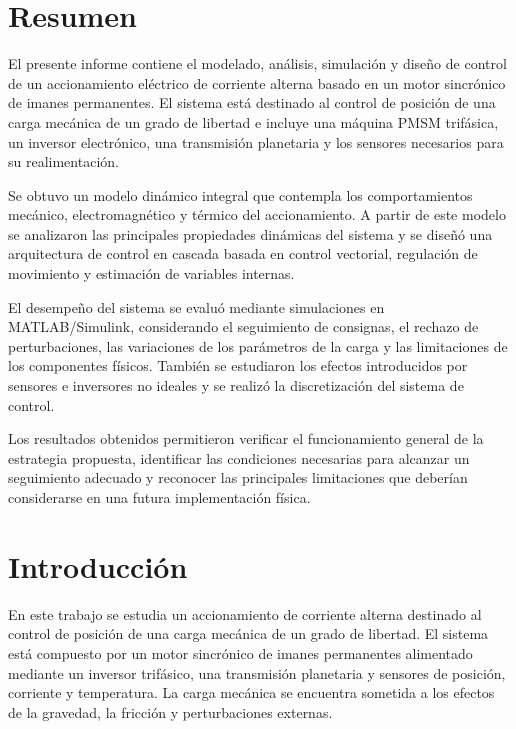 \documentclass[10pt,a4paper]{article}
\begin{document}
\clearpage
\setcounter{page}{1}
\pagestyle{fancy}

\section{Resumen}


El presente informe contiene el modelado, análisis, simulación y diseño de control de un accionamiento eléctrico de corriente alterna basado en un motor sincrónico de imanes permanentes. El sistema está destinado al control de posición de una carga mecánica de un grado de libertad e incluye una máquina PMSM trifásica, un inversor electrónico, una transmisión planetaria y los sensores necesarios para su realimentación.

Se obtuvo un modelo dinámico integral que contempla los comportamientos mecánico, electromagnético y térmico del accionamiento. A partir de este modelo se analizaron las principales propiedades dinámicas del sistema y se diseñó una arquitectura de control en cascada basada en control vectorial, regulación de movimiento y estimación de variables internas.

El desempeño del sistema se evaluó mediante simulaciones en MATLAB/Simulink, considerando el seguimiento de consignas, el rechazo de perturbaciones, las variaciones de los parámetros de la carga y las limitaciones de los componentes físicos. También se estudiaron los efectos introducidos por sensores e inversores no ideales y se realizó la discretización del sistema de control.

Los resultados obtenidos permitieron verificar el funcionamiento general de la estrategia propuesta, identificar las condiciones necesarias para alcanzar un seguimiento adecuado y reconocer las principales limitaciones que deberían considerarse en una futura implementación física.


\section{Introducción}

En este trabajo se estudia un accionamiento de corriente alterna destinado al control de posición de una carga mecánica de un grado de libertad. El sistema está compuesto por un motor sincrónico de imanes permanentes alimentado mediante un inversor trifásico, una transmisión planetaria y sensores de posición, corriente y temperatura. La carga mecánica se encuentra sometida a los efectos de la gravedad, la fricción y perturbaciones externas.
\end{document}

